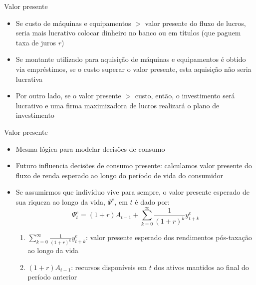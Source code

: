 \documentclass[10pt]{beamer}
\begin{document}
\begin{frame}
    {Valor presente}
    \begin{itemize}
        \item Se custo de máquinas e equipamentos $>$ valor presente do fluxo de lucros, seria mais lucrativo colocar dinheiro no banco ou em títulos (que paguem taxa de juros $r$)\bigskip
        \item Se montante utilizado para aquisição de máquinas e equipamentos é obtido via empréstimos, se o custo superar o valor presente, esta aquisição não seria lucrativa\bigskip
        \item Por outro lado, se o valor presente $>$ custo, então, o investimento será lucrativo e uma firma maximizadora de lucros realizará o plano de investimento
    \end{itemize}
\end{frame}

\begin{frame}
    {Valor presente}
    \begin{itemize}
        \item Mesma lógica para modelar decisões de consumo\bigskip
        \item Futuro influencia decisões de consumo presente: calculamos valor presente do fluxo de renda esperado ao longo do período de vida do consumidor\bigskip
        \item Se assumirmos que indivíduo vive para sempre, o valor presente esperado de sua riqueza ao longo da vida, $\Psi^e$, em $t$ é dado por:
        \begin{equation}
            \Psi_t^e = (1 + r)A_{t-1} + \sum_{k=0}^\infty \frac{1}{(1 + r)^k}y_{t+k}^e\label{aula7_eq2}
        \end{equation}
        \begin{enumerate}
            \item $\sum_{k=0}^\infty \frac{1}{(1 + r)^k}y_{t+k}^e$: valor presente esperado dos rendimentos pós-taxação ao longo da vida\medskip
            \item $(1 + r)A_{t-1}$: recursos disponíveis em $t$ dos ativos mantidos ao final do período anterior
        \end{enumerate}
    \end{itemize}
\end{frame}
\end{document}
